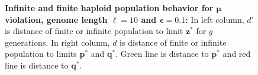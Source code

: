 \begin{figure}[h]
\begin{center}
\hspace{-3em}%
\vspace{-0.5em} \hspace{-3em}%


\caption[\textbf{Infinite and finite haploid population behavior for $\bm{\mu}$ violation, genome length $\ell = 10$ and $\bm{\epsilon} = 0.1$}]{\textbf{Infinite and finite haploid population behavior for $\bm{\mu}$ violation, genome length $\ell = 10$ and $\bm{\epsilon} = 0.1$:} 
  In left column, $d'$ is distance of finite or infinite population to limit $\bm{z}^\ast$ for $g$ generations. In right column, $d$ is distance of finite or infinite population to limits $\bm{p}^\ast$ and $\bm{q}^\ast$. Green line is distance to $\bm{p}^\ast$ and red line is distance to $\bm{q}^\ast$.}
\label{oscillation_10h_vio_mu_0.1}
\end{center}
\end{figure}

